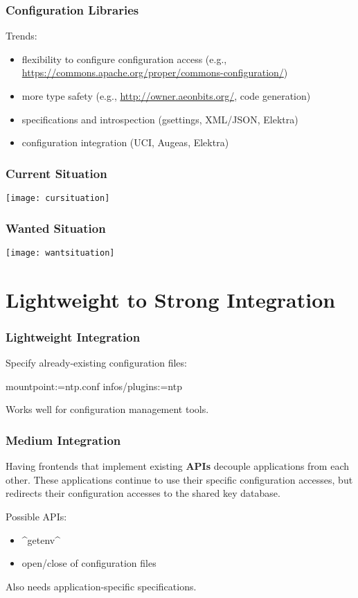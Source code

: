 \begin{frame}[fragile]
	\frametitle{Configuration Libraries}

	Trends:
	\begin{itemize}[<+-| alert@+>]
	\item flexibility to configure configuration access (e.g., \url{https://commons.apache.org/proper/commons-configuration/})
	\item more type safety (e.g., \url{http://owner.aeonbits.org/}, code generation)
	\item specifications and introspection (gsettings, XML/JSON, Elektra)
	\item configuration integration (UCI, Augeas, Elektra)
	\end{itemize}
\end{frame}

\begin{frame}
	\frametitle{Current Situation}
	\texttt{[image: cursituation]}
\end{frame}

\begin{frame}
	\frametitle{Wanted Situation}
	\texttt{[image: wantsituation]}
\end{frame}


\section{Lightweight to Strong Integration}

\begin{frame}[fragile]
	\frametitle{Lightweight Integration}

	Specify already-existing configuration files:
	\begin{code}[language=Cpp,gobble=4,showspaces=no]
	[ntp]
	  mountpoint:=ntp.conf
	  infos/plugins:=ntp
	\end{code}

	\vspace{1cm}
	Works well for configuration management tools.
\end{frame}

\begin{frame}[fragile]
	\frametitle{Medium Integration}

	Having frontends that implement existing \textbf{APIs} decouple applications from each other.
	These applications continue to use their specific configuration accesses, but \elektra{} redirects their configuration accesses to the shared key database.

	Possible APIs:
	\begin{itemize}[<+-| alert@+>]
	\item ^getenv^
	\item open/close of configuration files
	\end{itemize}

	\pause[\thebeamerpauses]
	\vspace{1cm}

	Also needs application-specific specifications.
\end{frame}

